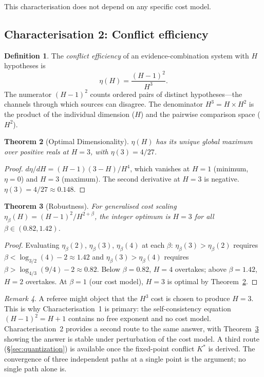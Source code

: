 \documentclass[11pt,a4paper]{article}
\newtheorem{theorem}{Theorem}[section]
\theoremstyle{definition}
\newtheorem{definition}[theorem]{Definition}
\theoremstyle{remark}
\newtheorem{remark}[theorem]{Remark}
\begin{document}
This characterisation does not depend on any specific cost model.

\subsection{Characterisation 2: Conflict efficiency}

\begin{definition}\label{def:efficiency}
The \emph{conflict efficiency} of an evidence-combination system with $H$ hypotheses is
\begin{equation}\label{eq:eta}
\eta(H)=\frac{(H-1)^2}{H^3}.
\end{equation}
The numerator $(H-1)^2$ counts ordered pairs of distinct hypotheses---the channels through which sources can disagree. The denominator $H^3=H\times H^2$ is the product of the individual dimension ($H$) and the pairwise comparison space ($H^2$).
\end{definition}

\begin{theorem}[Optimal Dimensionality]\label{thm:optimal}
$\eta(H)$ has its unique global maximum over positive reals at $H=3$, with $\eta(3)=4/27$.
\end{theorem}

\begin{proof}
$d\eta/dH=(H-1)(3-H)/H^4$, which vanishes at $H=1$ (minimum, $\eta=0$) and $H=3$ (maximum). The second derivative at $H=3$ is negative. $\eta(3)=4/27\approx 0.148$.
\end{proof}

\begin{theorem}[Robustness]\label{thm:robust}
For generalised cost scaling $\eta_\beta(H)=(H-1)^2/H^{2+\beta}$, the integer optimum is $H=3$ for all $\beta\in(0.82,1.42)$.
\end{theorem}

\begin{proof}
Evaluating $\eta_\beta(2)$, $\eta_\beta(3)$, $\eta_\beta(4)$ at each $\beta$: $\eta_\beta(3)>\eta_\beta(2)$ requires $\beta<\log_{3/2}(4)-2\approx 1.42$ and $\eta_\beta(3)>\eta_\beta(4)$ requires $\beta>\log_{4/3}(9/4)-2\approx 0.82$. Below $\beta=0.82$, $H=4$ overtakes; above $\beta=1.42$, $H=2$ overtakes. At $\beta=1$ (our cost model), $H=3$ is optimal by Theorem~\ref{thm:optimal}.
\end{proof}

\begin{remark}
A referee might object that the $H^3$ cost is chosen to produce $H=3$. This is why Characterisation~1 is primary: the self-consistency equation $(H-1)^2=H+1$ contains no free exponent and no cost model. Characterisation~2 provides a second route to the same answer, with Theorem~\ref{thm:robust} showing the answer is stable under perturbation of the cost model. A third route (\S\ref{sec:quantization}) is available once the fixed-point conflict $K^*$ is derived. The convergence of three independent paths at a single point is the argument; no single path alone is.
\end{remark}
\end{document}
